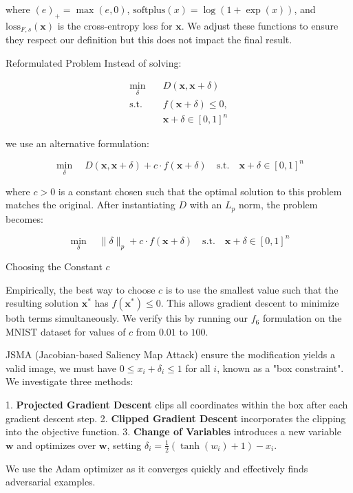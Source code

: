where $(e)_+ = \max(e, 0)$, $\text{softplus}(x) = \log(1 + \exp(x))$, and $\text{loss}_{F,s}(\mathbf{x})$ is the cross-entropy loss for $\mathbf{x}$. We adjust these functions to ensure they respect our definition but this does not impact the final result.

Reformulated Problem Instead of solving:

\begin{equation*}
\begin{aligned}
\min_{\delta} & \quad D(\mathbf{x}, \mathbf{x} + \delta) \\
\text{s.t.} & \quad f(\mathbf{x} + \delta) \leq 0, \\
& \quad \mathbf{x} + \delta \in [0, 1]^n
\end{aligned}
\end{equation*}

we use an alternative formulation:

\begin{equation*}
\min_{\delta} \quad D(\mathbf{x}, \mathbf{x} + \delta) + c \cdot f(\mathbf{x} + \delta)
\quad \text{s.t.} \quad \mathbf{x} + \delta \in [0, 1]^n
\end{equation*}

where $c > 0$ is a constant chosen such that the optimal solution to this problem matches the original. After instantiating $D$ with an $L_p$ norm, the problem becomes:

\begin{equation*}
\min_{\delta} \quad \|\delta\|_p + c \cdot f(\mathbf{x} + \delta)
\quad \text{s.t.} \quad \mathbf{x} + \delta \in [0, 1]^n
\end{equation*}

Choosing the Constant $c$

Empirically, the best way to choose $c$ is to use the smallest value such that the resulting solution $\mathbf{x}^*$ has $f(\mathbf{x}^*) \leq 0$. This allows gradient descent to minimize both terms simultaneously. We verify this by running our $f_6$ formulation on the MNIST dataset for values of $c$ from $0.01$ to $100$.

JSMA (Jacobian-based Saliency Map Attack) ensure the modification yields a valid image, we must have $0 \leq x_i + \delta_i \leq 1$ for all $i$, known as a "box constraint". We investigate three methods:

1. \textbf{Projected Gradient Descent} clips all coordinates within the box after each gradient descent step.
2. \textbf{Clipped Gradient Descent} incorporates the clipping into the objective function.
3. \textbf{Change of Variables} introduces a new variable $\mathbf{w}$ and optimizes over $\mathbf{w}$, setting $\delta_i = \frac{1}{2} (\tanh(w_i) + 1) - x_i$.

We use the Adam optimizer as it converges quickly and effectively finds adversarial examples.